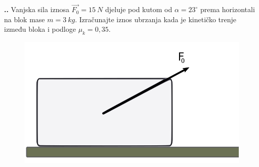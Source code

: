 

\noindent 
\textbf{
\thecjelina.\thezadatak.}
Vanjska sila iznosa $\vec{F_0}=15\ N$ djeluje pod kutom od $\alpha=23 ^\circ$ prema horizontali na blok mase $m=3\ kg$. Izračunajte iznos 
ubrzanja kada je kinetičko trenje između bloka i podloge $\mu_k=0,35$.


\begin{figure}[h]%
  \begin{center}
    \includegraphics[scale=0.29]{../03_Dinamika_materijalne_tocke/Zadatak_D201.png}
  \end{center}
\end{figure}
